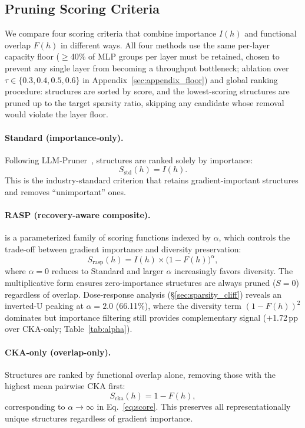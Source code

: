 \subsection{Pruning Scoring Criteria}
\label{sec:scoring}

We compare four scoring criteria that combine importance $I(h)$ and functional overlap $F(h)$ in different ways.
All four methods use the same per-layer capacity floor (${\ge}$40\% of MLP groups per layer must be retained, chosen to prevent any single layer from becoming a throughput bottleneck; ablation over $\tau \in \{0.3, 0.4, 0.5, 0.6\}$ in Appendix~\ref{sec:appendix_floor}) and global ranking procedure: structures are sorted by score, and the lowest-scoring structures are pruned up to the target sparsity ratio, skipping any candidate whose removal would violate the layer floor.

\paragraph{Standard (importance-only).}
Following LLM-Pruner~\citep{llmpruner2023}, structures are ranked solely by importance:
\begin{equation}
    S_\text{std}(h) = I(h).
    \label{eq:standard}
\end{equation}
This is the industry-standard criterion that retains gradient-important structures and removes ``unimportant'' ones.

\paragraph{RASP (recovery-aware composite).}
\rasp{} is a parameterized family of scoring functions indexed by $\alpha$, which controls the trade-off between gradient importance and diversity preservation:
\begin{equation}
    S_\text{rasp}(h) = I(h) \times \big(1 - F(h)\big)^\alpha,
    \label{eq:score}
\end{equation}
where $\alpha{=}0$ reduces to Standard and larger $\alpha$ increasingly favors diversity.
The multiplicative form ensures zero-importance structures are always pruned ($S{=}0$) regardless of overlap.
Dose-response analysis (\S\ref{sec:sparsity_cliff}) reveals an inverted-U peaking at $\alpha{=}2.0$ (66.11\%), where the diversity term $(1{-}F(h))^2$ dominates but importance filtering still provides complementary signal ($+$1.72\,pp over CKA-only; Table~\ref{tab:alpha}).


\paragraph{CKA-only (overlap-only).}
Structures are ranked by functional overlap alone, removing those with the highest mean pairwise CKA first:
\begin{equation}
    S_\text{cka}(h) = 1 - F(h),
    \label{eq:cka_only}
\end{equation}
corresponding to $\alpha \to \infty$ in Eq.~\ref{eq:score}.
This preserves all representationally unique structures regardless of gradient importance.


